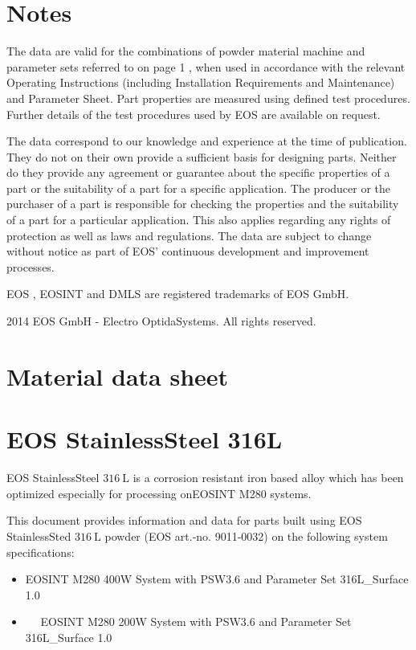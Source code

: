 \documentclass[10pt]{article}
\begin{document}
\section*{Notes}
The data are valid for the combinations of powder material machine and parameter sets referred to on page 1 , when used in accordance with the relevant Operating Instructions (including Installation Requirements and Maintenance) and Parameter Sheet. Part properties are measured using defined test procedures. Further details of the test procedures used by EOS are available on request.

The data correspond to our knowledge and experience at the time of publication. They do not on their own provide a sufficient basis for designing parts. Neither do they provide any agreement or guarantee about the specific properties of a part or the suitability of a part for a specific application. The producer or the purchaser of a part is responsible for checking the properties and the suitability of a part for a particular application. This also applies regarding any rights of protection as well as laws and regulations. The data are subject to change without notice as part of EOS' continuous development and improvement processes.

EOS , EOSINT and DMLS are registered trademarks of EOS GmbH.

2014 EOS GmbH - Electro OptidaSystems. All rights reserved.

\section*{Material data sheet}
\section*{EOS StainlessSteel 316L}
EOS StainlessSteel $316 \mathrm{~L}$ is a corrosion resistant iron based alloy which has been optimized especially for processing onEOSINT M280 systems.

This document provides information and data for parts built using EOS StainlessSted $316 \mathrm{~L}$ powder (EOS art.-no. 9011-0032) on the following system specifications:

\begin{itemize}
  \item EOSINT M280 400W System with PSW3.6 and Parameter Set 316L\_Surface 1.0
  \item $\quad$ EOSINT M280 200W System with PSW3.6 and Parameter Set 316L\_Surface 1.0
\end{itemize}
\end{document}
